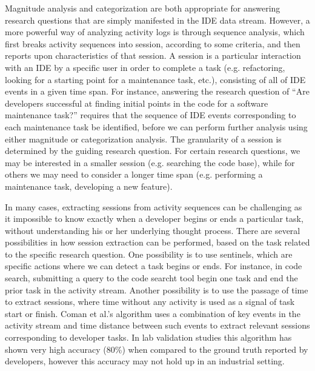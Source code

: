 Magnitude analysis and categorization are both appropriate for answering research questions that are simply manifested in the IDE data stream. However, a more powerful way of analyzing activity logs is through sequence analysis, which first breaks activity sequences into session, according to some criteria, and then reports upon characteristics of that session. A session is a particular interaction with an IDE by a specific user in order to complete a task (e.g. refactoring, looking for a starting point for a maintenance task, etc.), consisting of all of IDE events in a given time span.
For instance, answering the research question of ``Are developers successful at finding initial points in the code for a software maintenance task?'' requires that the sequence of IDE events corresponding to each maintenance task be identified, before we can perform further analysis using either magnitude or categorization analysis. The granularity of a session is determined by the guiding research question. For certain research questions, we may be interested in a smaller session (e.g. searching the code base), while for others we may need to consider a longer time span (e.g. performing a maintenance task, developing a new feature). 

In many cases, extracting sessions from activity sequences can be challenging as it impossible to know exactly when a developer begins or ends a particular task, without understanding his or her underlying thought process. There are several possibilities in how session extraction can be performed, based on the task related to the specific research question. One possibility is to use sentinels, which are specific actions where we can detect a task begins or ends. For instance, in code search, submitting a query to the code searcht tool begin one task and end the prior task in the activity stream. Another possibility is to use the passage of time to extract sessions, where time without any activity is used as a signal of task start or finish. Coman et al.'s \cite{Coman-TaskIdent} algorithm uses a combination of key events in the activity stream and time distance between such events to extract relevant sessions corresponding to developer tasks. In lab validation studies this algorithm has shown very high accuracy (80\%) when compared to the ground truth reported by developers, however this accuracy may not hold up in an industrial setting\cite{Zou-ComanIndustry}.


